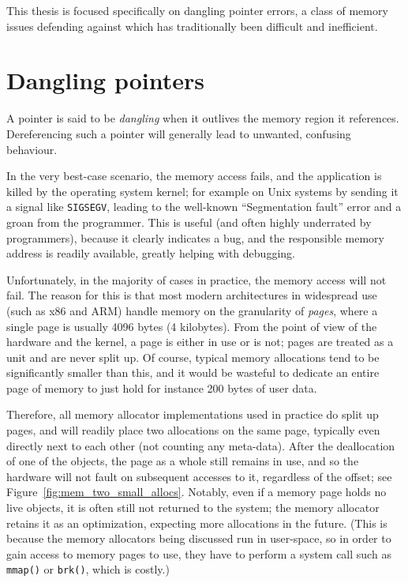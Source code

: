This thesis is focused specifically on dangling pointer errors, a class of memory issues defending against which has traditionally been difficult and inefficient.

\section{Dangling pointers}

A pointer is said to be \emph{dangling} when it outlives the memory region it references. Dereferencing such a pointer will generally lead to unwanted, confusing behaviour.

In the very best-case scenario, the memory access fails, and the application is killed by the operating system kernel; for example on Unix systems by sending it a signal like \lstinline!SIGSEGV!, leading to the well-known ``Segmentation fault'' error and a groan from the programmer. This is useful (and often highly underrated by programmers), because it clearly indicates a bug, and the responsible memory address is readily available, greatly helping with debugging.

Unfortunately, in the majority of cases in practice, the memory access will not fail. The reason for this is that most modern architectures in widespread use (such as x86 and ARM) handle memory on the granularity of \emph{pages}, where a single page is usually 4096 bytes (4 kilobytes). From the point of view of the hardware and the kernel, a page is either in use or is not; pages are treated as a unit and are never split up. Of course, typical memory allocations tend to be significantly smaller than this, and it would be wasteful to dedicate an entire page of memory to just hold for instance 200 bytes of user data.

Therefore, all memory allocator implementations used in practice do split up pages, and will readily place two allocations on the same page, typically even directly next to each other (not counting any meta-data). After the deallocation of one of the objects, the page as a whole still remains in use, and so the hardware will not fault on subsequent accesses to it, regardless of the offset; see Figure~\ref{fig:mem_two_small_allocs}. Notably, even if a memory page holds no live objects, it is often still not returned to the system; the memory allocator retains it as an optimization, expecting more allocations in the future. (This is because the memory allocators being discussed run in user-space, so in order to gain access to memory pages to use, they have to perform a system call such as \lstinline|mmap()| or \lstinline|brk()|, which is costly.)

